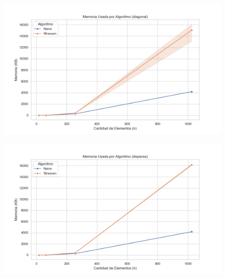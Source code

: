 \begin{figure}[H]
    \centering
    \begin{minipage}[t]{1\textwidth}
        \includegraphics[width=\textwidth]{../code/matrix_multiplication/data/plots/memoria_vs_algoritmo_diagonal.png}
     \end{minipage}%
    \caption{}
    \label{fig:scatterplot_3}
\end{figure}

\begin{figure}[H]
    \centering
    \begin{minipage}[t]{1\textwidth}
        \includegraphics[width=\textwidth]{../code/matrix_multiplication/data/plots/memoria_vs_algoritmo_dispersa.png}
     \end{minipage}%
    \caption{}
    \label{fig:scatterplot_3}
\end{figure}

